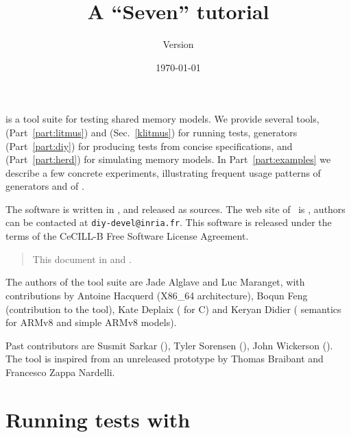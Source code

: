 \documentclass{article}
\title{A \prog{diy} ``Seven'' tutorial}
\author{Version \version}
\date{\today}
\begin{document}
\maketitle

\diy{} is a tool suite for testing shared memory models.  We
provide several tools, \litmus{} (Part~\ref{part:litmus})
and \klitmus{} (Sec.~\ref{klitmus}) for running tests,
\diy{} generators (Part~\ref{part:diy}) for producing tests from concise
specifications, and
\herd{} (Part~\ref{part:herd}) for simulating memory models.
In Part~\ref{part:examples} we describe
a few concrete experiments, illustrating frequent usage patterns of
\diy{} generators and of \litmus.


The software is written in
, and released as
sources.  The web site of~\diy{} is
, authors can be contacted at
\texttt{diy-devel@inria.fr}.
This software is released under the terms of the CeCILL-B Free Software License
Agreement.



\begin{htmlonly}
\begin{quote}
This document in  and .
\end{quote}
\end{htmlonly}

The authors of the \diy{} tool suite are Jade Alglave and Luc Maranget,
with contributions
by Antoine Hacquerd (X86\_64 architecture),
Boqun Feng (contribution to the  tool),
Kate Deplaix (\litmus{} for C) and
Keryan Didier (\herd{} semantics for ARMv8 and simple ARMv8 models).

Past contributors are Susmit Sarkar (),
Tyler Sorensen (), John Wickerson ().
The tool  is inspired from an unreleased prototype by
Thomas Braibant and Francesco Zappa Nardelli.

\tableofcontents
\cutend

\clearpage
\part{Running\label{part:litmus} tests with \litmus}

\end{document}
